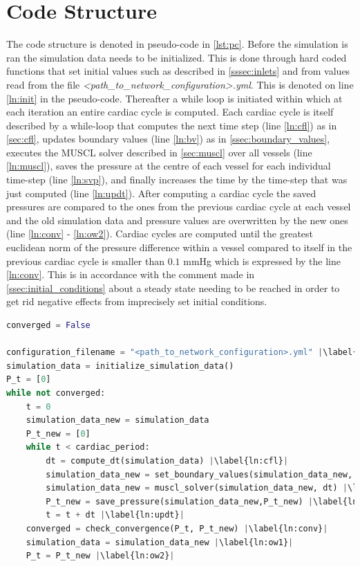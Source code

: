 \documentclass[a4paper, oneside]{discothesis}
\begin{document}
\section{Code Structure} \label{sec:cs}
The code structure is denoted in pseudo-code in \autoref{lst:pc}.
Before the simulation is ran the simulation data needs to be initialized.
This is done through hard coded functions that set initial values such as described in \autoref{sssec:inlets} and from values read from the file \emph{<path\_to\_network\_configuration>.yml}.
This is denoted on line \ref{ln:init} in the pseudo-code.
Thereafter a while loop is initiated within which at each iteration an entire cardiac cycle is computed.
Each cardiac cycle is itself described by a while-loop that computes the next time step (line \ref{ln:cfl}) as in \autoref{sec:cfl}, updates boundary values (line \ref{ln:bv}) as in \autoref{ssec:boundary_values}, executes the MUSCL solver described in \autoref{sec:muscl} over all vessels (line \ref{ln:muscl}), saves the pressure at the centre of each vessel for each individual time-step (line \ref{ln:svp}), and finally increases the time by the time-step that was just computed (line \ref{ln:updt}).
After computing a cardiac cycle the saved pressures are compared to the ones from the previous cardiac cycle at each vessel and the old simulation data and pressure values are overwritten by the new ones (line \ref{ln:conv} - \ref{ln:ow2}).
Cardiac cycles are computed until the greatest euclidean norm of the pressure difference within a vessel compared to itself in the previous cardiac cycle is smaller than $0.1$ mmHg which is expressed by the line \ref{ln:conv}.
This is in accordance with the comment made in \autoref{ssec:initial_conditions} about a steady state needing to be reached in order to get rid negative effects from imprecisely set initial conditions.
\begin{lstlisting}[language=Python, caption=code structure in pseudocode, label=lst:pc, escapechar=|]
converged = False

configuration_filename = "<path_to_network_configuration>.yml" |\label{ln:init}|
simulation_data = initialize_simulation_data()
P_t = [0]
while not converged:
	t = 0
	simulation_data_new = simulation_data
	P_t_new = [0]
	while t < cardiac_period:
		dt = compute_dt(simulation_data) |\label{ln:cfl}|
		simulation_data_new = set_boundary_values(simulation_data_new, dt) |\label{ln:bv}|
		simulation_data_new = muscl_solver(simulation_data_new, dt) |\label{ln:muscl}|
		P_t_new = save_pressure(simulation_data_new,P_t_new) |\label{ln:svp}|
		t = t + dt |\label{ln:updt}|
	converged = check_convergence(P_t, P_t_new) |\label{ln:conv}|
	simulation_data = simulation_data_new |\label{ln:ow1}|
	P_t = P_t_new |\label{ln:ow2}|
\end{lstlisting}
\end{document}
